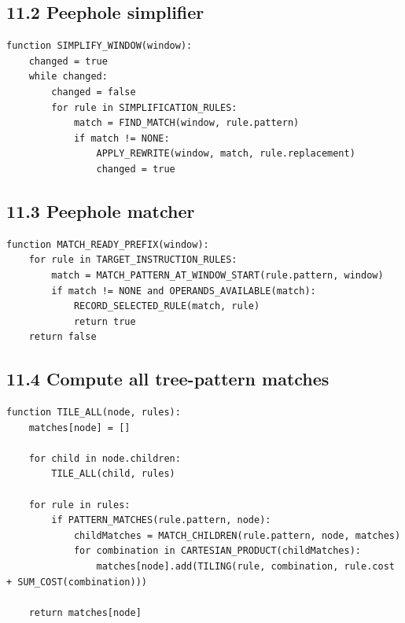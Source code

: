 \documentclass[10pt,letterpaper]{article}
\begin{document}
\subsection*{11.2 Peephole simplifier}

\begin{verbatim}
function SIMPLIFY_WINDOW(window):
    changed = true
    while changed:
        changed = false
        for rule in SIMPLIFICATION_RULES:
            match = FIND_MATCH(window, rule.pattern)
            if match != NONE:
                APPLY_REWRITE(window, match, rule.replacement)
                changed = true
\end{verbatim}

\subsection*{11.3 Peephole matcher}

\begin{verbatim}
function MATCH_READY_PREFIX(window):
    for rule in TARGET_INSTRUCTION_RULES:
        match = MATCH_PATTERN_AT_WINDOW_START(rule.pattern, window)
        if match != NONE and OPERANDS_AVAILABLE(match):
            RECORD_SELECTED_RULE(match, rule)
            return true
    return false
\end{verbatim}

\subsection*{11.4 Compute all tree-pattern matches}

\begin{verbatim}
function TILE_ALL(node, rules):
    matches[node] = []

    for child in node.children:
        TILE_ALL(child, rules)

    for rule in rules:
        if PATTERN_MATCHES(rule.pattern, node):
            childMatches = MATCH_CHILDREN(rule.pattern, node, matches)
            for combination in CARTESIAN_PRODUCT(childMatches):
                matches[node].add(TILING(rule, combination, rule.cost + SUM_COST(combination)))

    return matches[node]
\end{verbatim}
\end{document}
